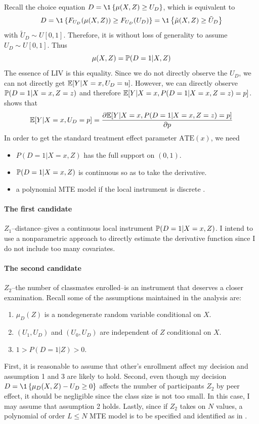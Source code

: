\documentclass[12pt]{article}
\begin{document}
Recall the choice equation $D=\1\set{\mu(X,Z)\ge U_D}$, which is equivalent to
$$D=\1\set{F_{U_D}(\mu(X,Z))\ge F_{U_D}(U_D)}= \1\set{\tilde{\mu}(X,Z)\ge
        \tilde{U}_D}$$ with $\tilde{U}_D\sim U[0,1]$. Therefore, it is without loss of
generality to assume $U_D\sim U[0,1]$. Thus
\begin{equation}
    \mu(X,Z)=\mathbb{P}(D=1|X,Z)
\end{equation}
The essence of LIV is this equality. Since we do not directly observe the $U_D$, we can not directly get $\mathbb{E}[Y|X=x,U_D=u]$. However, we can directly observe $\mathbb{P}(D=1|X=x,Z=z)$ and therefore $\mathbb{E}[Y|X=x,P(D=1|X=x,Z=z)=p]$. \citet{heckman2005structural} shows that
\begin{equation*}
    \mathbb{E}[Y|X=x,U_D=p]=\frac{\partial \mathbb{E}[Y|X=x,P(D=1|X=x,Z=z)=p]}{\partial p}
\end{equation*}
In order to get the standard treatment effect parameter $\text{ATE}(x)$, we need \begin{itemize}
    \item $P(D=1|X=x,Z)$ has the full support on $(0,1)$.
    \item $\mathbb{P}(D=1|X=x,Z)$ is continuous so as to take the derivative.
    \item a polynomial MTE model if the local instrument is discrete
          \citep{brinch2017beyond}.
\end{itemize}
\paragraph{The first candidate} $Z_1$--distance--gives a continuous local
instrument $\mathbb{P}(D=1|X=x,Z)$. I intend to use a nonparametric approach to
directly estimate the derivative function since I do not include too many
covariates. \paragraph{The second candidate} $Z_2$--the number of classmates enrolled--is an
instrument that deserves a closer examination. Recall some of the assumptions
maintained in the analysis are:
\begin{enumerate}
    \item $\mu_D(Z)$ is a nondegenerate random variable conditional on $X$.
    \item $(U_1, U_D)$ and $(U_0, U_D)$ are independent of $Z$ conditional on $X$.
    \item $1 > P(D=1|Z) > 0$.
\end{enumerate}
First, it is reasonable to assume that other's enrollment affect my decision and assumption 1 and 3 are likely to hold. Second, even though my decision $D=\1\set{\mu_D(X,Z)-U_D\ge 0}$ affects the number of participants $Z_2$ by peer effect, it should be negligible since the class size is not too small. In this case, I may assume that assumption 2 holds. Lastly, since if $Z_2$ takes on $N$ values, a polynomial of order $L\le N$ MTE model is to be specified and identified as in \citet{brinch2017beyond}.
\end{document}

